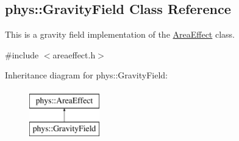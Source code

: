 \hypertarget{classphys_1_1GravityField}{
\subsection{phys::GravityField Class Reference}
\label{d4/d8a/classphys_1_1GravityField}
}


This is a gravity field implementation of the \hyperlink{classphys_1_1AreaEffect}{AreaEffect} class.  




{\ttfamily \#include $<$areaeffect.h$>$}

Inheritance diagram for phys::GravityField:\begin{figure}[H]
\begin{center}
\leavevmode
\includegraphics[height=2.000000cm]{d4/d8a/classphys_1_1GravityField}
\end{center}
\end{figure}
